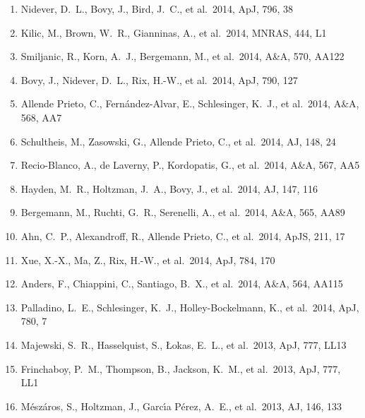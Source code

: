 \documentclass[12pt]{article}
\begin{document}
\begin{enumerate}
\item Nidever, D.~L., Bovy, 
J., Bird, J.~C., et al.\ 2014, ApJ, 796, 38 


\item Kilic, M., Brown, W.~R., 
Gianninas, A., et al.\ 2014, MNRAS, 444, L1 


\item Smiljanic, R., Korn, A.~J., Bergemann, M., et al.\ 2014, A\&A, 570, AA122 


\item Bovy, J., Nidever, D.~L., 
Rix, H.-W., et al.\ 2014, ApJ, 790, 127 


\item Allende Prieto, C., Fern{\'a}ndez-Alvar, E., Schlesinger, K.~J., et al.\ 2014, A\&A, 568, AA7 


\item Schultheis, M., 
Zasowski, G., Allende Prieto, C., et al.\ 2014, AJ, 148, 24 


\item Recio-Blanco, A., de Laverny, P., Kordopatis, G., et al.\ 2014, A\&A, 567, AA5 


\item Hayden, M.~R., Holtzman, 
J.~A., Bovy, J., et al.\ 2014, AJ, 147, 116 


\item Bergemann, M., Ruchti, G.~R., Serenelli, A., et al.\ 2014, A\&A, 565, AA89 


\item Ahn, C.~P., Alexandroff, 
R., Allende Prieto, C., et al.\ 2014, ApJS, 211, 17 


\item Xue, X.-X., Ma, Z., Rix, 
H.-W., et al.\ 2014, ApJ, 784, 170 


\item Anders, F., Chiappini, C., Santiago, B.~X., et al.\ 2014, A\&A, 564, AA115 


\item Palladino, L.~E., 
Schlesinger, K.~J., Holley-Bockelmann, K., et al.\ 2014, ApJ, 780, 7 


\item Majewski, S.~R., 
Hasselquist, S., {\L}okas, E.~L., et al.\ 2013, ApJ, 777, LL13 


\item Frinchaboy, P.~M., 
Thompson, B., Jackson, K.~M., et al.\ 2013, ApJ, 777, LL1 


\item 
M{\'e}sz{\'a}ros, S., Holtzman, J., Garc{\'{\i}}a P{\'e}rez, A.~E., et al.\ 
2013, AJ, 146, 133 



\end{enumerate}
\end{document}
